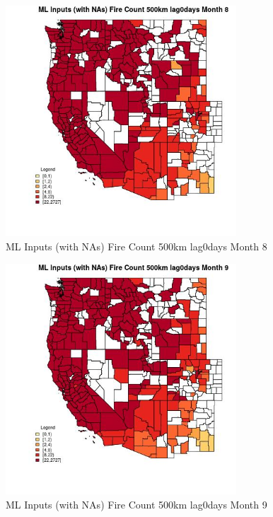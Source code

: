 \begin{figure} 
\centering  
\includegraphics[width=0.77\textwidth]{Code_Outputs/Report_ML_input_PM25_Step4_part_f_de_duplicated_aveswNAs_CountyFire_Count_500km_lag0daysmedianMonth8.jpg} 
\caption{\label{fig:Report_ML_input_PM25_Step4_part_f_de_duplicated_aveswNAsCountyFire_Count_500km_lag0daysmedianMonth8}ML Inputs (with NAs) Fire Count 500km lag0days Month 8} 
\end{figure} 
 

\begin{figure} 
\centering  
\includegraphics[width=0.77\textwidth]{Code_Outputs/Report_ML_input_PM25_Step4_part_f_de_duplicated_aveswNAs_CountyFire_Count_500km_lag0daysmedianMonth9.jpg} 
\caption{\label{fig:Report_ML_input_PM25_Step4_part_f_de_duplicated_aveswNAsCountyFire_Count_500km_lag0daysmedianMonth9}ML Inputs (with NAs) Fire Count 500km lag0days Month 9} 
\end{figure} 
 

